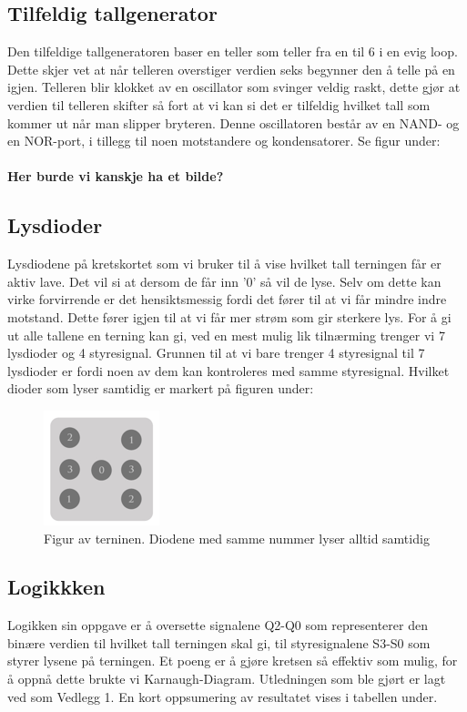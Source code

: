 \documentclass[12pt,norsk,a4paper]{article}
\begin{document}
    \subsection{Tilfeldig tallgenerator}
    Den tilfeldige tallgeneratoren baser en teller som teller fra en til 6 i en evig loop. Dette skjer vet at når telleren overstiger verdien seks begynner den å telle på en igjen. Telleren blir klokket av en oscillator som svinger
    veldig raskt, dette gjør at verdien til telleren skifter så fort at vi kan si det er tilfeldig hvilket tall som kommer ut når man slipper bryteren. Denne oscillatoren består av en NAND- og en NOR-port, i tillegg til noen motstandere og kondensatorer. Se figur under:
    \\
    \\
    \textbf{Her burde vi kanskje ha et bilde?} 

    
    \subsection{Lysdioder}
    Lysdiodene på kretskortet som vi bruker til å vise hvilket tall terningen får er aktiv lave. Det vil si at dersom de får inn '0'
    så vil de lyse. Selv om dette kan virke forvirrende er det hensiktsmessig fordi det fører til at vi får mindre indre motstand. Dette fører igjen til at vi får mer strøm som gir sterkere lys. For å gi ut alle tallene en terning kan gi, ved en mest mulig lik tilnærming trenger vi 7 lysdioder og 4 styresignal. Grunnen til at vi bare trenger 4 styresignal til 7 lysdioder er fordi noen av dem kan kontroleres med samme styresignal. Hvilket dioder som lyser samtidig er markert på figuren under:

    \begin{figure}[H]
    \begin{center}
    \includegraphics[scale=1]{Terning.png}
    \caption{Figur av terninen. Diodene med samme nummer lyser alltid samtidig}
    \label{fig:terning}
    \end{center}
    \end{figure}

    \subsection{Logikkken}
    Logikken sin oppgave er å oversette signalene Q2-Q0 som representerer den binære verdien til hvilket tall terningen skal gi, til styresignalene S3-S0 som styrer lysene på terningen. Et poeng er å gjøre kretsen så effektiv som mulig, for å oppnå dette brukte vi Karnaugh-Diagram. Utledningen som ble gjørt er lagt ved som Vedlegg 1. En kort oppsumering av resultatet vises i tabellen under.
\end{document}
